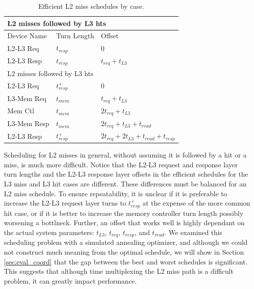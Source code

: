 \def\dc{Blue}
\begin{table}
    \caption{Efficient L2 miss schedules by case.}
    \centering
    \begin{tabular}{|r|r|l|l|}
        \hline
        \multicolumn{4}{|l|}{L2 misses followed by L3 hts}\\\hline
        \multicolumn{2}{|l|}{Device Name} & Turn Length & Offset\\\hline
        \multicolumn{2}{|l|}{L2-L3 Req}  & $t_{resp}$ & 0\\\hline
        \multicolumn{2}{|l|}{L2-L3 Resp} & $t_{resp}$ &
          $t_{req}+t_{L3}$\\\hline\hline
        \multicolumn{4}{|l|}{L2 misses followed by L3 hts}\\\hline
        \multicolumn{2}{|l|}{L2-L3 Req}   & $t_{resp}^+$ & 0\\\hline
        \multicolumn{2}{|l|}{L3-Mem Req}  & $t_{mem}$ & $t_{req}+t_{L3}$\\\hline
        \multicolumn{2}{|l|}{Mem Ctl}     & $t_{mem}$ & $2t_{req}+t_{L3}$\\\hline
        \multicolumn{2}{|l|}{L3-Mem Resp} & $t_{mem}$ & 
          $2t_{req}+t_{L3}+t_{read}$\\\hline
        \multicolumn{2}{|l|}{L2-L3 Resp}  & $t_{resp}^+$ &
          $2t_{req}+2t_{L3}+t_{read}+t_{resp}$\\\hline
    \end{tabular}
    \label{tab:l2_miss_schedules}
\end{table}

Scheduling for L2 misses in general, without assuming it is followed by a hit 
or a miss, is much more difficult. Notice that the L2-L3 request and response 
layer turn lengths and the L2-L3 response layer offsets in the efficient 
schedules for the L3 miss and L3 hit cases are different. These differences 
must be balanced for an L2 miss schedule. To ensure repeatability, it is 
unclear if it is preferable to increase the L2-L3 request layer turns to 
$t_{resp}^+$ at the expense of the more common hit case, or if it is better to 
increase the memory controller turn length possibly worsening a bottlneck.
Further, an offset that works well is highly dependant on the actual system 
parameters: $t_{L3}$, $t_{req}$, $t_{resp}$, and $t_{read}$.
We examined this scheduling problem with a simulated annealing optimizer,
and although we could not construct much meaning from the optimal 
schedule, we will show in Section \ref{sec:eval_coord} that the gap between
the best and worst schedules is significant. This suggests that although time 
multiplexing the L2 miss path is a difficult problem, it can greatly impact 
performance.
